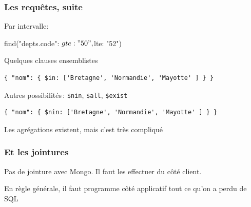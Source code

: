 \begin{frame}[fragile]
\frametitle{Les requêtes, suite}



\begin{redbullet}
  \item Par intervalle:

\begin{smallverbatim}
find({"depts.code": {$gte: "50", $lte: "52"}})
\end{smallverbatim}


 \item Quelques clauses ensemblistes 

\begin{verbatim}
{ "nom": { $in: ['Bretagne', 'Normandie', 'Mayotte' ] } }
\end{verbatim}

\item
Autres possibilités\,: \texttt{\$nin}, \texttt{\$all}, \texttt{\$exist}

\begin{verbatim}
{ "nom": { $nin: ['Bretagne', 'Normandie', 'Mayotte' ] } }
\end{verbatim}

\end{redbullet}
\vfill

\begin{noteblock}
Les agrégations existent, mais c'est très compliqué
\end{noteblock}
\end{frame}


\begin{frame}[fragile]
\frametitle{Et les jointures}

Pas de jointure avec Mongo.
Il faut les effectuer du \alert{côté client}. 

\vfill


\vfill

En règle générale, il faut programme côté applicatif tout ce qu'on a perdu de SQL
\end{frame}


